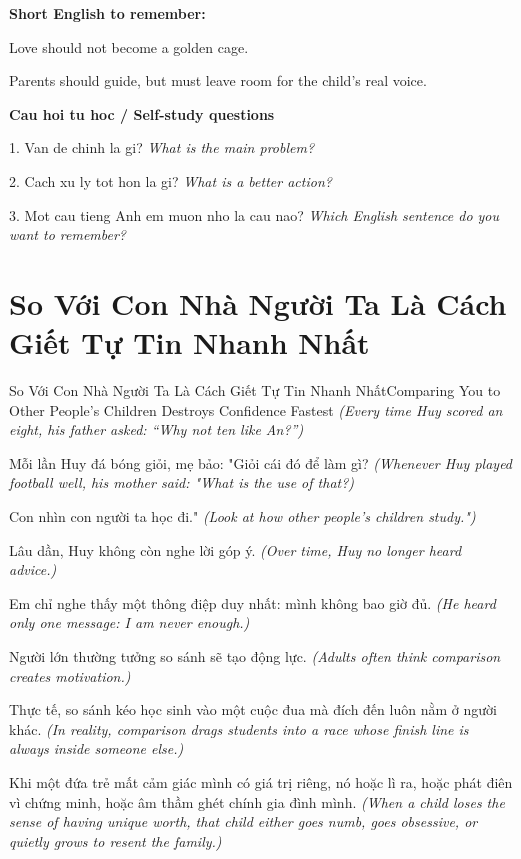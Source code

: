 \begin{ghinhoanh}
\textbf{Short English to remember:}

Love should not become a golden cage.

Parents should guide, but must leave room for the child’s real voice.

\end{ghinhoanh}

\begin{tuhocnhanh}
\textbf{Cau hoi tu hoc / Self-study questions}

1. Van de chinh la gi? \textit{What is the main problem?}

2. Cach xu ly tot hon la gi? \textit{What is a better action?}

3. Mot cau tieng Anh em muon nho la cau nao? \textit{Which English sentence do you want to remember?}
\end{tuhocnhanh}
\ngancach

\section{So Với Con Nhà Người Ta Là Cách Giết Tự Tin Nhanh Nhất}
\begin{truyen}{So Với Con Nhà Người Ta Là Cách Giết Tự Tin Nhanh Nhất}{Comparing You to Other People’s Children Destroys Confidence Fastest}
\textit{(Every time Huy scored an eight, his father asked: ``Why not ten like An?'')}

Mỗi lần Huy đá bóng giỏi, mẹ bảo: "Giỏi cái đó để làm gì?
\textit{(Whenever Huy played football well, his mother said: "What is the use of that?)}

Con nhìn con người ta học đi."
\textit{(Look at how other people’s children study.")}

Lâu dần, Huy không còn nghe lời góp ý.
\textit{(Over time, Huy no longer heard advice.)}

Em chỉ nghe thấy một thông điệp duy nhất: mình không bao giờ đủ.
\textit{(He heard only one message: I am never enough.)}

Người lớn thường tưởng so sánh sẽ tạo động lực.
\textit{(Adults often think comparison creates motivation.)}

Thực tế, so sánh kéo học sinh vào một cuộc đua mà đích đến luôn nằm ở người khác.
\textit{(In reality, comparison drags students into a race whose finish line is always inside someone else.)}

Khi một đứa trẻ mất cảm giác mình có giá trị riêng, nó hoặc lì ra, hoặc phát điên vì chứng minh, hoặc âm thầm ghét chính gia đình mình.
\textit{(When a child loses the sense of having unique worth, that child either goes numb, goes obsessive, or quietly grows to resent the family.)}

\end{truyen}

